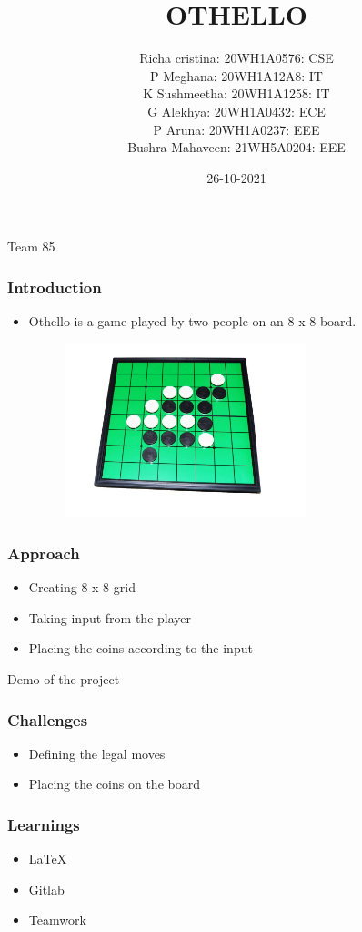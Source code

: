 \documentclass[14pt]{beamer}
\title{OTHELLO}
\date{26-10-2021}
\author[Bvrith]{Richa cristina: 20WH1A0576: CSE \\P Meghana: 20WH1A12A8: IT\\K Sushmeetha: 20WH1A1258: IT\\G Alekhya: 20WH1A0432: ECE\\P Aruna: 20WH1A0237: EEE\\Bushra Mahaveen: 21WH5A0204: EEE}
\begin{document}
    \begin{frame}
        \titlepage
          \begin{center}
	        Team 85
	      \end{center}
    \end{frame}
    \begin{frame}
	\frametitle{Introduction}
        \begin{itemize}
	    \item  Othello is a game played by two people on an 8 x 8 board.
		\vspace {0.2in}
               \begin{figure}
                   \includegraphics [width=7cm] {othellobg.jpg}
               \end{figure}
	\end{itemize}
    \end{frame}
    \begin{frame}
	\frametitle{Approach}
	\begin{itemize}
	    \item Creating 8 x 8 grid
           \item Taking input from the player
           \item Placing the coins according to the input
	\end{itemize}
    \end{frame}

    \begin{frame}
          \begin{center}
	          Demo of the project
	     \end{center}
     \end{frame}

 \begin{frame}
	\frametitle{Challenges}
        \begin{itemize}
	     \item Defining the legal moves
           \item Placing the coins on the board
     \end{itemize}
\end{frame}
    \begin{frame}
        \frametitle{Learnings}
	\begin{itemize}
	      \item LaTeX
            \item Gitlab
             \item Teamwork
	\end{itemize}
    \end{frame}
\end{document}
